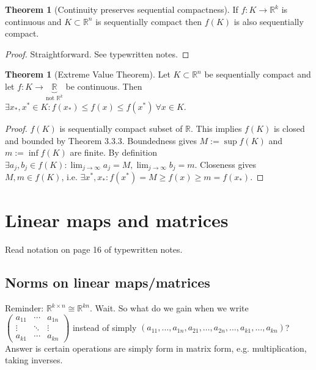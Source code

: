\documentclass[a4paper]{article}
\theoremstyle{definition}
\newtheorem{thm}[defn]{Theorem}
\begin{document}
\begin{thm}[Continuity preserves sequential compactness]
If $f:K\rightarrow \mathbb R^k$ is continuous and $K\subset \mathbb R^n$ is sequentially compact then $f(K)$ is also sequentially compact.
\end{thm}
\begin{proof}
Straightforward. See typewritten notes.
\end{proof}

\begin{thm}[Extreme Value Theorem]
Let $K\subset \mathbb R^n$ be sequentially compact and let $f:K\rightarrow \underbrace{\mathbb R}_{\text{not }\mathbb R^k}$ be continuous. Then $\exists x_\ast, x^\ast \in K : f(x_\ast) \leq f(x) \leq f(x^\ast) \ \forall x\in K$.
\end{thm}
\begin{proof}
$f(K)$ is sequentially compact subset of $\mathbb R$. This implies $f(K)$ is closed and bounded by Theorem 3.3.3. Boundedness gives $M:=\sup f(K)$ and $m:=\inf f(K)$ are finite. By definition $\exists a_j,b_j\in f(K):\lim_{j\rightarrow \infty}a_j=M,\lim_{j\rightarrow \infty}b_j=m$. Closeness gives $M,m\in f(K)$, i.e. $\exists x^\ast, x_\ast : f(x^\ast)=M\geq f(x)\geq m=f(x_\ast).$
\end{proof}

\section{Linear maps and matrices}
Read notation on page 16 of typewritten notes.
\subsection{Norms on linear maps/matrices}
Reminder: $\mathbb R^{k\times n} \cong \mathbb R^{k n}$. Wait. So what do we gain when we write $\begin{pmatrix}a_{11} & \cdots & a_{1n} \\ \vdots & \ddots & \vdots \\ a_{k1} & \cdots & a_{kn}\end{pmatrix}$ instead of simply $(a_{11},\ldots,a_{1n},a_{21},\ldots,a_{2n},\ldots,a_{k1},\ldots,a_{kn})$? Answer is certain operations are simply form in matrix form, e.g. multiplication, taking inverses.
\end{document}
